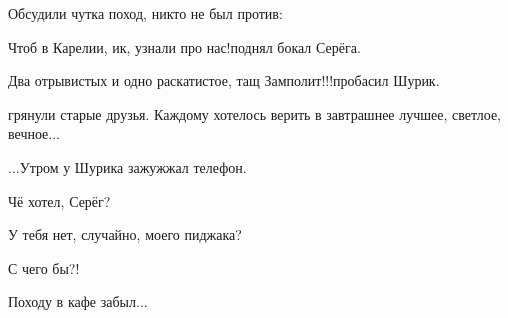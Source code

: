 {Обсудили чутка поход, никто не был против:

\diagdash Чтоб в Карелии, ик, узнали про нас!\mdash поднял бокал Серёга.

\diagdash Два отрывистых и одно раскатистое, тащ Замполит!!!\mdash пробасил Шурик.

\mdash грянули старые друзья. Каждому хотелось верить в завтрашнее лучшее, светлое, вечное$\ldots$

\vspace{1.5cm}

$\ldots$Утром у Шурика зажужжал телефон. 

\diagdash Чё хотел, Серёг?

\diagdash У тебя нет, случайно, моего пиджака?

\diagdash С чего бы?!

\diagdash Походу в кафе забыл$\ldots$

\begin{center}
\end{center}
}